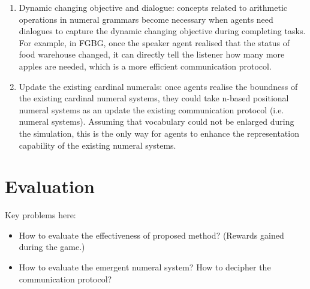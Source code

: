 \documentclass[a4paper,11pt]{article}
\begin{document}
\begin{enumerate}
  \item Dynamic changing objective and dialogue: concepts related to arithmetic operations in numeral grammars become necessary when agents need dialogues to capture the dynamic changing objective during completing tasks. For example, in FGBG, once the speaker agent realised that the status of food warehouse changed, it can directly tell the listener how many more apples are needed, which is a more efficient communication protocol.
  \item Update the existing cardinal numerals: once agents realise the boundness of the existing cardinal numeral systems, they could take n-based positional numeral systems as an update the existing communication protocol (i.e. numeral systems). Assuming that vocabulary could not be enlarged during the simulation, this is the only way for agents to enhance the representation capability of the existing numeral systems.
\end{enumerate}


\section{Evaluation}
\label{sec:4evaluaion}

Key problems here:

\begin{itemize}
  \item How to evaluate the effectiveness of proposed method? (Rewards gained during the game.)
  \item How to evaluate the emergent numeral system? How to decipher the communication protocol?
\end{itemize}
\end{document}
